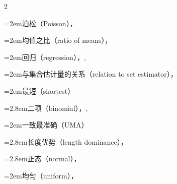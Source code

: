 \begin{multicols}{2}
\par\noindent\hangindent=2em\hspace*{1em}\label{idx:168}泊松（Poisson），\hyperref[ex:9.2.15]{\pageref*{ex:9.2.15}}\par
\par\noindent\hangindent=2em\hspace*{1em}\label{idx:169}均值之比（ratio of means），\hyperref[sec:9.5.3]{\pageref*{sec:9.5.3}}\par
\par\noindent\hangindent=2em\hspace*{1em}\label{idx:170}回归（regression），\hyperref[eq:11.3.37]{\pageref*{eq:11.3.37}}, \hyperref[sec:11.3.6]{\pageref*{sec:11.3.6}}\par
\par\noindent\hangindent=2em\hspace*{1em}\label{idx:171}与集合估计量的关系（relation to set estimator），\hyperref[idxocc:171:369]{\pageref*{idxocc:171:369}}\par
{}
\par\noindent\hangindent=2em\hspace*{1em}\label{idx:172}最短（shortest）\par
\par\noindent\hangindent=2.8em\hspace*{1.8em}\label{idx:173}二项（binomial），\hyperref[ex:9.2.11]{\pageref*{ex:9.2.11}}, \hyperref[exercise:9.18]{\pageref*{exercise:9.18}}\par
{}
\par\noindent\hangindent=2em\hspace*{1em}\label{idx:174}一致最准确（UMA）\par
\par\noindent\hangindent=2.8em\hspace*{1.8em}\label{idx:175}长度优势（length dominance），\hyperref[exercise:9.45]{\pageref*{exercise:9.45}}\par
\par\noindent\hangindent=2.8em\hspace*{1.8em}\label{idx:176}正态（normal），\hyperref[exercise:9.47]{\pageref*{exercise:9.47}}\par
\par\noindent\hangindent=2em\hspace*{1em}\label{idx:177}均匀（uniform），\hyperref[ex:9.1.6]{\pageref*{ex:9.1.6}}\par

\end{multicols}
